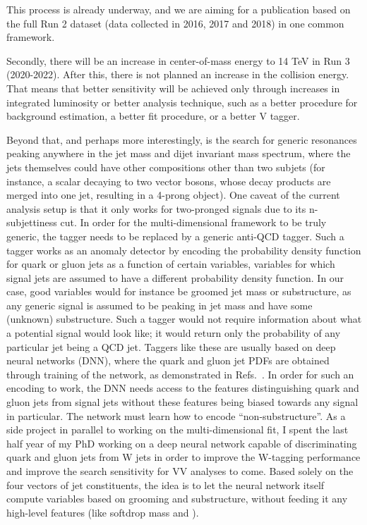 This process is already underway, and we are aiming for a publication based on the full Run 2 dataset (data collected in 2016, 2017 and 2018) in one common framework.\par
Secondly, there will be an increase in center-of-mass energy to 14 TeV in Run 3 (2020-2022). After this, there is not planned an increase in the collision energy. That means that better sensitivity will be achieved only through increases in integrated luminosity or better analysis technique, such as a better procedure for background estimation, a better fit procedure, or a better V tagger.\par
Beyond that, and perhaps more interestingly, is the search for generic resonances peaking anywhere in the jet mass and dijet invariant mass spectrum, where the jets themselves could have other compositions other than two subjets (for instance, a scalar decaying to two vector bosons, whose decay products are merged into one jet, resulting in a 4-prong object). One caveat of the current analysis setup is that it only works for two-pronged signals due to its n-subjettiness cut. In order for the multi-dimensional framework to be truly generic, the \nsubj tagger needs to be replaced by a generic anti-QCD tagger. Such a tagger works as an anomaly detector by encoding the probability density function for quark or gluon jets as a function of certain variables, variables for which signal jets are assumed to have a different probability density function.
In our case, good variables would for instance be groomed jet mass or substructure, as any generic signal is assumed to be peaking in jet mass and have some (unknown) substructure. Such a tagger would not require information about what a potential signal would look like; it would return only the probability of any particular jet being a QCD jet. Taggers like these are usually based on deep neural networks (DNN), where the quark and gluon jet PDFs are obtained through training of the network, as demonstrated in Refs.~\cite{Heimel:2018mkt,Aguilar-Saavedra:2017rzt}.\newline
In order for such an encoding to work, the DNN needs access to the features distinguishing quark and gluon jets from signal jets without these features being biased towards any signal in particular. The network must learn how to encode ``non-substructure''.\newline
As a side project in parallel to working on the multi-dimensional fit, I spent the last half year of my PhD working on a deep neural network capable of discriminating quark and gluon jets from W jets in order to improve the W-tagging performance and improve the search sensitivity for VV analyses to come. Based solely on the four vectors of jet constituents, the idea is to let the neural network itself compute variables based on grooming and substructure, without feeding it any high-level features (like softdrop mass and \nsubj). 
